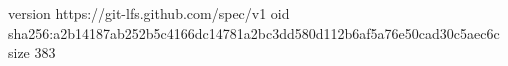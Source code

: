 version https://git-lfs.github.com/spec/v1
oid sha256:a2b14187ab252b5c4166dc14781a2bc3dd580d112b6af5a76e50cad30c5aec6c
size 383
